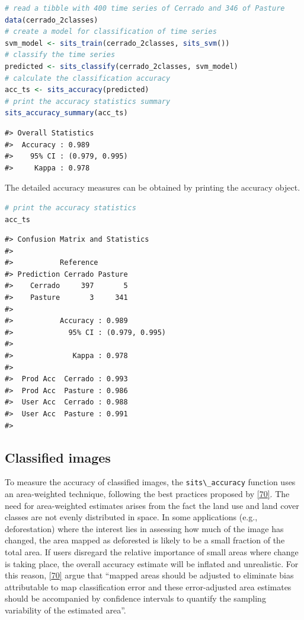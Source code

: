 \documentclass[
  11pt,
]{report}
\newcommand{\passthrough}[1]{#1}
\begin{document}
\begin{lstlisting}[language=R]
# read a tibble with 400 time series of Cerrado and 346 of Pasture
data(cerrado_2classes)
# create a model for classification of time series
svm_model <- sits_train(cerrado_2classes, sits_svm())
# classify the time series
predicted <- sits_classify(cerrado_2classes, svm_model)
# calculate the classification accuracy
acc_ts <- sits_accuracy(predicted)
# print the accuracy statistics summary
sits_accuracy_summary(acc_ts)
\end{lstlisting}

\begin{lstlisting}
#> Overall Statistics                          
#>  Accuracy : 0.989         
#>    95% CI : (0.979, 0.995)
#>     Kappa : 0.978
\end{lstlisting}

The detailed accuracy measures can be obtained by printing the accuracy
object.

\begin{lstlisting}[language=R]
# print the accuracy statistics
acc_ts 
\end{lstlisting}

\begin{lstlisting}
#> Confusion Matrix and Statistics
#> 
#>           Reference
#> Prediction Cerrado Pasture
#>    Cerrado     397       5
#>    Pasture       3     341
#>                                    
#>           Accuracy : 0.989         
#>             95% CI : (0.979, 0.995)
#>                                    
#>              Kappa : 0.978         
#>                                    
#>  Prod Acc  Cerrado : 0.993         
#>  Prod Acc  Pasture : 0.986         
#>  User Acc  Cerrado : 0.988         
#>  User Acc  Pasture : 0.991         
#> 
\end{lstlisting}

\hypertarget{classified-images}{%
\subsection*{Classified images}\label{classified-images}}

To measure the accuracy of classified images, the
\passthrough{\lstinline!sits\_accuracy!} function uses an area-weighted
technique, following the best practices proposed by
\protect\hyperlink{ref-Olofsson2013}{{[}70{]}}. The need for
area-weighted estimates arises from the fact the land use and land cover
classes are not evenly distributed in space. In some applications (e.g.,
deforestation) where the interest lies in assessing how much of the
image has changed, the area mapped as deforested is likely to be a small
fraction of the total area. If users disregard the relative importance
of small areas where change is taking place, the overall accuracy
estimate will be inflated and unrealistic. For this reason,
\protect\hyperlink{ref-Olofsson2013}{{[}70{]}} argue that ``mapped areas
should be adjusted to eliminate bias attributable to map classification
error and these error-adjusted area estimates should be accompanied by
confidence intervals to quantify the sampling variability of the
estimated area''.
\end{document}

